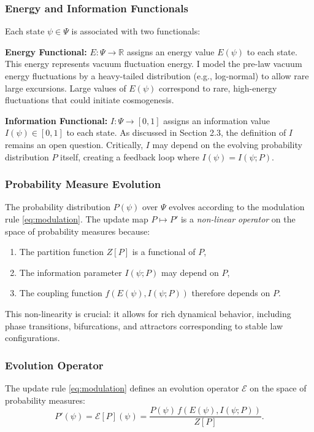 \documentclass[12pt,a4paper]{article}
\theoremstyle{definition}
\theoremstyle{remark}
\begin{document}
\subsubsection{Energy and Information Functionals}

Each state $\psi \in \Psi$ is associated with two functionals:

\textbf{Energy Functional:} $E: \Psi \to \mathbb{R}$ assigns an energy value $E(\psi)$ to each state. This energy represents vacuum fluctuation energy. I model the pre-law vacuum energy fluctuations by a heavy-tailed distribution (e.g., log-normal) to allow rare large excursions. Large values of $E(\psi)$ correspond to rare, high-energy fluctuations that could initiate cosmogenesis.

\textbf{Information Functional:} $I: \Psi \to [0,1]$ assigns an information value $I(\psi) \in [0,1]$ to each state. As discussed in Section 2.3, the definition of $I$ remains an open question. Critically, $I$ may depend on the evolving probability distribution $P$ itself, creating a feedback loop where $I(\psi) = I(\psi; P)$.

\subsubsection{Probability Measure Evolution}

The probability distribution $P(\psi)$ over $\Psi$ evolves according to the modulation rule \eqref{eq:modulation}. The update map $P \mapsto P'$ is a \emph{non-linear operator} on the space of probability measures because:
\begin{enumerate}
\item The partition function $Z[P]$ is a functional of $P$,
\item The information parameter $I(\psi; P)$ may depend on $P$,
\item The coupling function $f(E(\psi), I(\psi; P))$ therefore depends on $P$.
\end{enumerate}

This non-linearity is crucial: it allows for rich dynamical behavior, including phase transitions, bifurcations, and attractors corresponding to stable law configurations.

\subsubsection{Evolution Operator}

The update rule \eqref{eq:modulation} defines an evolution operator $\mathcal{E}$ on the space of probability measures:
\begin{equation}\label{eq:evolution_operator}
P'(\psi) = \mathcal{E}[P](\psi) = \frac{P(\psi) \, f(E(\psi), I(\psi; P))}{Z[P]}.
\end{equation}
\end{document}
